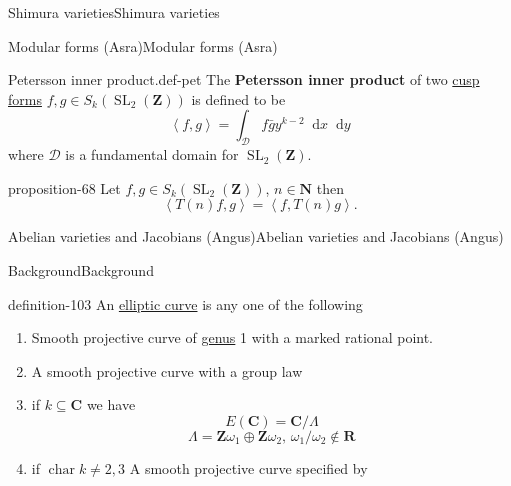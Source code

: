 \documentclass[10pt,]{book}
\newcommand{\terminology}[1]{\textbf{#1}}
\numberwithin{equation}{section}
\newcommand{\diff}{\mathop{}\!\mathrm{d}}
\newcommand{\pair}[2]{\left\langle #1, #2 \right\rangle}
\newcommand{\NN}{\mathbf{N}}
\newcommand{\ZZ}{\mathbf{Z}}
\newcommand{\RR}{\mathbf{R}}
\newcommand{\CC}{\mathbf{C}}
\DeclareMathOperator{\characteristic}{char}
\DeclareMathOperator{\SL}{SL}
\begin{document}
\begin{chapterptx}{Shimura varieties}{}{Shimura varieties}{}{}
\begin{sectionptx}{Modular forms (Asra)}{}{Modular forms (Asra)}{}{}
\begin{definition}{Petersson inner product.}{def-pet}
\hypertarget{p-1087}{}%
The \terminology{Petersson inner product} of two \hyperref[def-buntes-cusp-forms]{cusp forms} \(f,g\in S_k(\SL_2(\ZZ))\) is defined to be%
\begin{equation*}
\pair{f}{g} = \int_{\mathcal D} f \bar g y^{k-2} \diff x \diff y
\end{equation*}
where \(\mathcal D\) is a fundamental domain for \(\SL_2(\ZZ)\).%
\end{definition}
\begin{proposition}{}{}{proposition-68}%
\hypertarget{p-1088}{}%
Let \(f,g\in S_k(\SL_2(\ZZ))\), \(n\in \NN\) then%
\begin{equation*}
\pair{T(n) f}{g} = \pair{f}{T(n)g}\text{.}
\end{equation*}
%
\end{proposition}
\end{sectionptx}
%
%
\typeout{************************************************}
\typeout{************************************************}
%
\begin{sectionptx}{Abelian varieties and Jacobians (Angus)}{}{Abelian varieties and Jacobians (Angus)}{}{}\label{sec-buntes-av-jac}
%
%
\typeout{************************************************}
\typeout{************************************************}
%
\begin{subsectionptx}{Background}{}{Background}{}{}\label{subsection-78}
\begin{definition}{}{definition-103}%
\hypertarget{p-1089}{}%
An \hyperref[def-supersing-isog-ec]{elliptic curve} is any one of the following\leavevmode%
\begin{enumerate}
\item\hypertarget{li-270}{}Smooth projective curve of \hyperref[def-class-set]{genus} 1 with  a marked rational point.%
\item\hypertarget{li-271}{}A smooth projective curve with a group law%
\item\hypertarget{li-272}{}if \(k \subseteq \CC\) we have%
\begin{equation*}
E(\CC) = \CC/ \Lambda
\end{equation*}
%
\begin{equation*}
\Lambda = \ZZ \omega_1 \oplus \ZZ \omega_2,\, \omega_1/\omega_2 \not\in \RR
\end{equation*}
%
\item\hypertarget{li-273}{}if \(\characteristic k \ne 2,3\) A smooth projective curve specified by%

\end{enumerate}
\end{definition}
\end{subsectionptx}
\end{sectionptx}
\end{chapterptx}
\end{document}
